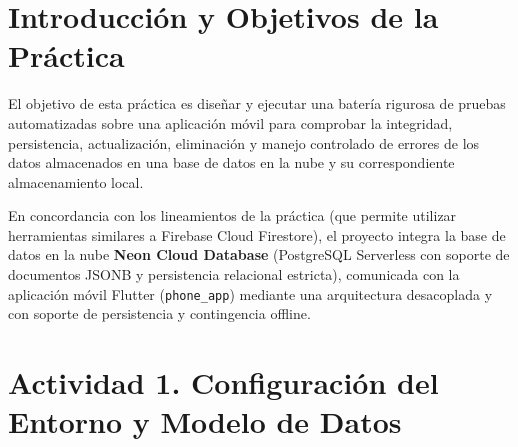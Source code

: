 \documentclass[11pt,a4paper]{article}
\begin{document}
\newpage
\tableofcontents
\newpage

\section{Introducción y Objetivos de la Práctica}

El objetivo de esta práctica es diseñar y ejecutar una batería rigurosa de pruebas automatizadas sobre una aplicación móvil para comprobar la integridad, persistencia, actualización, eliminación y manejo controlado de errores de los datos almacenados en una base de datos en la nube y su correspondiente almacenamiento local.

En concordancia con los lineamientos de la práctica (que permite utilizar herramientas similares a Firebase Cloud Firestore), el proyecto integra la base de datos en la nube \textbf{Neon Cloud Database} (PostgreSQL Serverless con soporte de documentos JSONB y persistencia relacional estricta), comunicada con la aplicación móvil Flutter (\texttt{phone\_app}) mediante una arquitectura desacoplada y con soporte de persistencia y contingencia offline.

\section{Actividad 1. Configuración del Entorno y Modelo de Datos}
\end{document}
